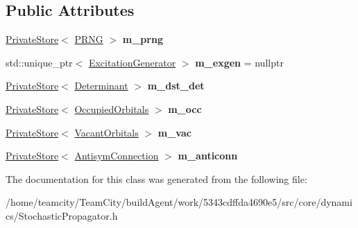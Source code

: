 \subsection*{Public Attributes}
\begin{DoxyCompactItemize}
\item 
\hyperlink{classPrivateStore}{Private\+Store}$<$ \hyperlink{classPRNG}{P\+R\+NG} $>$ {\bfseries m\+\_\+prng}\hypertarget{classStochasticPropagator_a9701eaea25d3b07f61c4421d077c780b}{}\label{classStochasticPropagator_a9701eaea25d3b07f61c4421d077c780b}

\item 
std\+::unique\+\_\+ptr$<$ \hyperlink{classExcitationGenerator}{Excitation\+Generator} $>$ {\bfseries m\+\_\+exgen} = nullptr\hypertarget{classStochasticPropagator_aca146b724867f97bd6d6b1531b021403}{}\label{classStochasticPropagator_aca146b724867f97bd6d6b1531b021403}

\item 
\hyperlink{classPrivateStore}{Private\+Store}$<$ \hyperlink{classDeterminant}{Determinant} $>$ {\bfseries m\+\_\+dst\+\_\+det}\hypertarget{classStochasticPropagator_a904656d5488a2fcec4984ee97266f241}{}\label{classStochasticPropagator_a904656d5488a2fcec4984ee97266f241}

\item 
\hyperlink{classPrivateStore}{Private\+Store}$<$ \hyperlink{structOccupiedOrbitals}{Occupied\+Orbitals} $>$ {\bfseries m\+\_\+occ}\hypertarget{classStochasticPropagator_a36203ead28dbd5653f4fb99cabdda1a7}{}\label{classStochasticPropagator_a36203ead28dbd5653f4fb99cabdda1a7}

\item 
\hyperlink{classPrivateStore}{Private\+Store}$<$ \hyperlink{structVacantOrbitals}{Vacant\+Orbitals} $>$ {\bfseries m\+\_\+vac}\hypertarget{classStochasticPropagator_a3214e327b81f1877d91d8f328237d930}{}\label{classStochasticPropagator_a3214e327b81f1877d91d8f328237d930}

\item 
\hyperlink{classPrivateStore}{Private\+Store}$<$ \hyperlink{classAntisymConnection}{Antisym\+Connection} $>$ {\bfseries m\+\_\+anticonn}\hypertarget{classStochasticPropagator_a3cf9cca5ab79c154d55b91be4e381387}{}\label{classStochasticPropagator_a3cf9cca5ab79c154d55b91be4e381387}

\end{DoxyCompactItemize}


The documentation for this class was generated from the following file\+:\begin{DoxyCompactItemize}
\item 
/home/teamcity/\+Team\+City/build\+Agent/work/5343cdffda4690e5/src/core/dynamics/Stochastic\+Propagator.\+h\end{DoxyCompactItemize}
